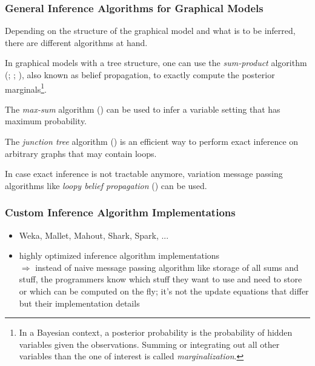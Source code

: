\subsubsection{General Inference Algorithms for Graphical Models}

Depending on the structure of the graphical model and what is to be inferred, there are different algorithms at hand. 

In graphical models with a tree structure, one can use the \emph{sum-product} algorithm (\cite{pearl1988probabilistic}; \cite{kim1983computational}; \cite{pearl1982reverend}), also known as belief propagation, to exactly compute the posterior marginals\footnote{In a Bayesian context, a posterior probability is the probability of hidden variables given the observations. Summing or integrating out all other variables than the one of interest is called \emph{marginalization}.}.

The \emph{max-sum} algorithm (\cite{dawid1992applications}) can be used to infer a variable setting that has maximum probability.

The \emph{junction tree} algorithm (\cite{lauritzen1988local}) is an efficient way to perform exact inference on arbitrary graphs that may contain loops.

In case exact inference is not tractable anymore, variation message passing algorithms like \emph{loopy belief propagation} (\cite{frey1998revolution}) can be used.

\subsubsection{Custom Inference Algorithm Implementations}
\label{subsec:custom-inference}

\begin{itemize}
\item Weka, Mallet, Mahout, Shark, Spark, ...
\item highly optimized inference algorithm implementations\\
$\Rightarrow$ instead of naive message passing algorithm like storage of all sums and stuff, the programmers know which stuff they want to use and need to store or which can be computed on the fly; it's not the update equations that differ but their implementation details
\end{itemize}

